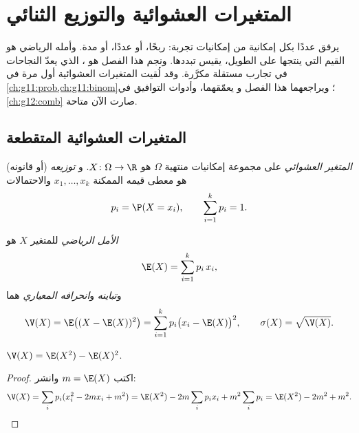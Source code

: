 \chapter{المتغيرات العشوائية والتوزيع الثنائي}\label{ch:g12:randvar}

يرفق  عددًا بكل إمكانية من إمكانيات تجربة: ربحًا،
أو عددًا، أو مدة. وأمله الرياضي هو  القيم التي ينتجها على
 الطويل،  يقيس تبددها. ونجم هذا
الفصل هو ، الذي يعدّ النجاحات في تجارب مستقلة
مكرَّرة. وقد لُقيت المتغيرات العشوائية 
أول مرة في \cref{ch:g11:prob,ch:g11:binom}؛ ويراجعهما هذا الفصل و
يعمّقهما، وأدوات التوافيق في \cref{ch:g12:comb} صارت الآن
متاحة.

\section{المتغيرات العشوائية المتقطعة}

\begin{definition}\label{def:g12:randvar:rv}
\emph{المتغير العشوائي} على مجموعة إمكانيات منتهية
$\Omega$ هو  $X \colon \Omega \to \R$. و
\emph{توزيعه} (أو قانونه) هو معطى قيمه الممكنة
$x_1, \dots, x_k$ والاحتمالات
\[
p_i = \P(X = x_i), \qquad \sum_{i=1}^{k} p_i = 1 .
\]
\end{definition}

\begin{definition}\label{def:g12:randvar:exp}
\emph{الأمل الرياضي} للمتغير $X$ هو
\[
\E(X) = \sum_{i=1}^{k} p_i\, x_i ,
\]
و\emph{تباينه} و\emph{انحرافه المعياري} هما
\[
\V(X) = \E\bigl((X - \E(X))^2\bigr) = \sum_{i=1}^k p_i\bigl(x_i - \E(X)\bigr)^2,
\qquad
\sigma(X) = \sqrt{\V(X)} .
\]
\end{definition}

\begin{proposition}\label{prop:g12:randvar:konig}
$\V(X) = \E(X^2) - \E(X)^2$.
\end{proposition}

\begin{proof}
اكتب $m = \E(X)$ وانشر:
\[
\V(X) = \sum_i p_i (x_i^2 - 2m x_i + m^2)
= \E(X^2) - 2m\sum_i p_i x_i + m^2\sum_i p_i
= \E(X^2) - 2m^2 + m^2 . \qedhere
\]
\end{proof}

